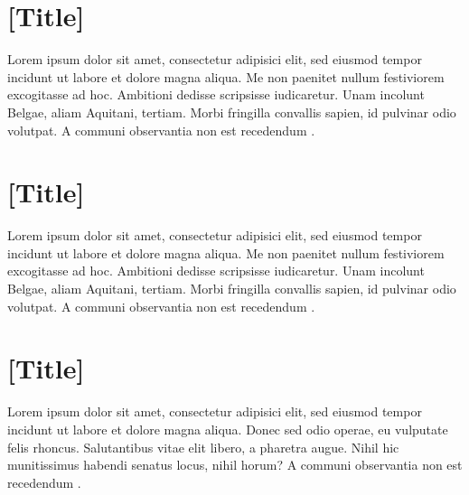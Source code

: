 \begin{apendicesenv}

  \chapter{[Title]}

  Lorem ipsum dolor sit amet, consectetur adipisici elit, sed eiusmod tempor incidunt ut labore et dolore magna aliqua. Me non paenitet nullum festiviorem excogitasse ad hoc. Ambitioni dedisse scripsisse iudicaretur. Unam incolunt Belgae, aliam Aquitani, tertiam. Morbi fringilla convallis sapien, id pulvinar odio volutpat. A communi observantia non est recedendum \autocite{rand2007}.

  \chapter{[Title]}

  Lorem ipsum dolor sit amet, consectetur adipisici elit, sed eiusmod tempor incidunt ut labore et dolore magna aliqua. Me non paenitet nullum festiviorem excogitasse ad hoc. Ambitioni dedisse scripsisse iudicaretur. Unam incolunt Belgae, aliam Aquitani, tertiam. Morbi fringilla convallis sapien, id pulvinar odio volutpat. A communi observantia non est recedendum \autocite{deffuant2002}.

  \chapter{[Title]}

  Lorem ipsum dolor sit amet, consectetur adipisici elit, sed eiusmod tempor incidunt ut labore et dolore magna aliqua. Donec sed odio operae, eu vulputate felis rhoncus. Salutantibus vitae elit libero, a pharetra augue. Nihil hic munitissimus habendi senatus locus, nihil horum? A communi observantia non est recedendum \autocite{casti1996}.

\end{apendicesenv}

